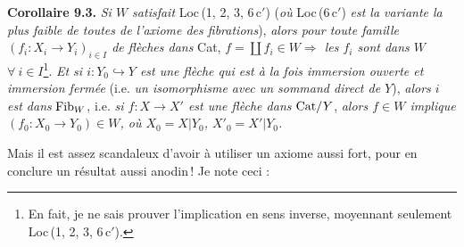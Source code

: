 \textbf{Corollaire 9.3.} \textit{Si $W$ satisfait} Loc\,(1, 2, 3, 6\,c$'$) (\textit{où} Loc\,(6\,c$'$) \textit{est la variante la plus faible de toutes de l'axiome des fibrations}), \textit{alors pour toute famille $(f_i : X_i\longrightarrow Y_i)_{i\in I}$ de flèches dans} Cat, \textit{$f=\coprod f_i\in W\Longrightarrow$ les $f_i$ sont dans $W$ $\forall\ i\in I$}\footnote[47]{En fait, je ne sais prouver l'implication en sens inverse, moyennant seulement Loc\,(1, 2, 3, 6\,c$'$).}. \textit{Et si $i : Y_0\hookrightarrow Y$ est une flèche qui est à la fois immersion ouverte et immersion fermée} (i.e. \textit{un isomorphisme avec un sommand direct de $Y$}), \textit{alors $i$ est dans} $\mathrm{Fib}_W$, i.e. \textit{si $f : X\longrightarrow X'$ est une flèche dans} $\mathrm{Cat}/Y$, \textit{alors $f\in W$ implique $(f_0 : X_0\longrightarrow Y_0)\in W$, où $X_0=X|Y_0$, $X'_0=X'|Y_0$.} %

Mais il est assez scandaleux d'avoir à utiliser un axiome aussi fort, pour en conclure un résultat aussi anodin\,! Je note ceci :

